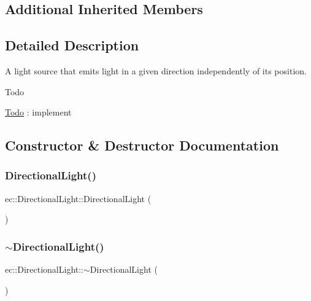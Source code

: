 \subsection*{Additional Inherited Members}


\subsection{Detailed Description}
A light source that emits light in a given direction independently of its position. 

\begin{DoxyRefDesc}{Todo}
\item[\mbox{\hyperlink{todo__todo000001}{Todo}}]\+: implement \end{DoxyRefDesc}


\subsection{Constructor \& Destructor Documentation}
\mbox{\label{classec_1_1_directional_light_a21208a110e98ec0db1b7d9edef25e502}} 
\subsubsection{\texorpdfstring{Directional\+Light()}{DirectionalLight()}}
{\footnotesize\ttfamily ec\+::\+Directional\+Light\+::\+Directional\+Light (\begin{DoxyParamCaption}{ }\end{DoxyParamCaption})\hspace{0.3cm}{\ttfamily [explicit]}}

\mbox{\label{classec_1_1_directional_light_a73b5c62493aa93c576517509207a2168}} 
\subsubsection{\texorpdfstring{$\sim$\+Directional\+Light()}{~DirectionalLight()}}
{\footnotesize\ttfamily ec\+::\+Directional\+Light\+::$\sim$\+Directional\+Light (\begin{DoxyParamCaption}{ }\end{DoxyParamCaption})\hspace{0.3cm}{\ttfamily [default]}}



